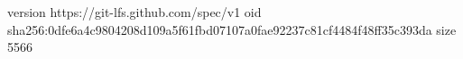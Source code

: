 version https://git-lfs.github.com/spec/v1
oid sha256:0dfe6a4c9804208d109a5f61fbd07107a0fae92237c81cf4484f48ff35c393da
size 5566
